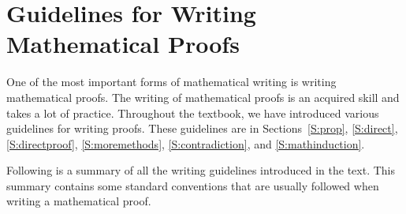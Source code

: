 \chapter{Guidelines for Writing Mathematical Proofs} \label{C:writingguides}
%

One of the most important forms of mathematical writing is writing mathematical proofs.  The writing of mathematical proofs is an acquired skill and takes a lot of practice. Throughout the textbook, we have introduced various guidelines for writing proofs.  These guidelines are in Sections~\ref{S:prop}, \ref{S:direct}, \ref{S:directproof}, \ref{S:moremethods}, \ref{S:contradiction}, and \ref{S:mathinduction}.

Following is a summary of all the writing guidelines introduced in the text.  This summary contains some standard conventions that are usually followed when writing a mathematical proof.

